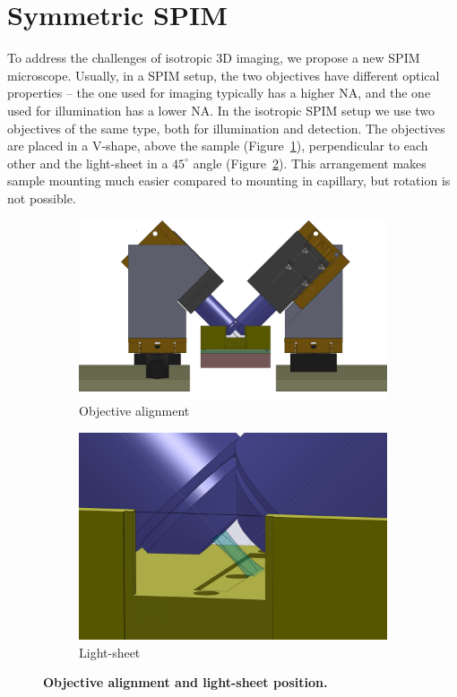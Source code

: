 \documentclass{tdk_style}
\begin{document}
\section{Symmetric SPIM}
To address the challenges of isotropic 3D imaging, we propose a new SPIM microscope. Usually, in a SPIM setup, the two objectives have different optical properties -- the one used for imaging typically has a higher NA, and the one used for illumination has a lower NA. In the isotropic SPIM setup we use two objectives of the same type, both for illumination and detection. The objectives are placed in a V-shape, above the sample (Figure~\ref{fig:objectives1}), perpendicular to each other and the light-sheet in a $45^\circ$ angle (Figure~\ref{fig:objectives2}). This arrangement makes sample mounting much easier compared to mounting in capillary, but rotation is not possible.
\begin{figure}[tpd]
	\centering
	\begin{subfigure}[b]{0.49\textwidth}
		\centering
		\includegraphics[width=\textwidth]{figures/2_spim/Image01}
		\caption{Objective alignment}
		\label{fig:objectives1}
	\end{subfigure}
	\begin{subfigure}[b]{0.49\textwidth}
		\centering
		\includegraphics[width=\textwidth]{figures/2_spim/Image04}
		\caption{Light-sheet}
		\label{fig:objectives2}
	\end{subfigure}
	\caption{\textbf{Objective alignment and light-sheet position.}}
	\label{fig:objectives}
\end{figure}
\end{document}
